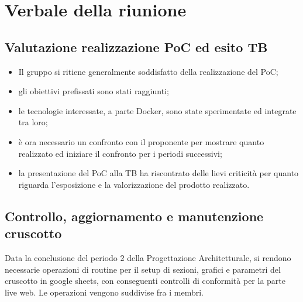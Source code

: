 \section{Verbale della riunione}

\subsection{Valutazione realizzazione PoC ed esito TB}
\begin{itemize}
    \item Il gruppo si ritiene generalmente soddisfatto della realizzazione del PoC;
    \item gli obiettivi prefissati sono stati raggiunti;
    \item le tecnologie interessate, a parte Docker, sono state sperimentate ed integrate tra loro;
    \item è ora necessario un confronto con il proponente per mostrare quanto realizzato ed iniziare il confronto per i periodi successivi;
    \item la presentazione del PoC alla TB ha riscontrato delle lievi criticità per quanto riguarda l'esposizione e la valorizzazione del prodotto realizzato.
\end{itemize}

\subsection{Controllo, aggiornamento e manutenzione cruscotto}
Data la conclusione del periodo 2 della Progettazione Architetturale, si rendono necessarie operazioni di routine per il setup di sezioni, grafici e parametri del cruscotto in google sheets, con conseguenti controlli di conformità per la parte live web. Le operazioni vengono suddivise fra i membri.

